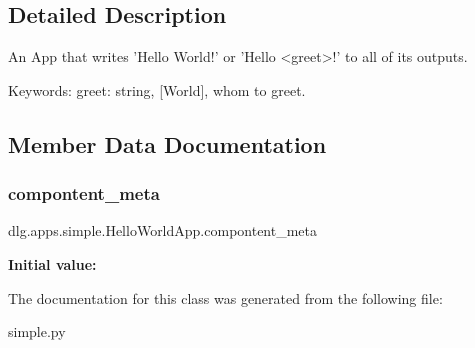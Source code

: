 \subsection{Detailed Description}
\begin{DoxyVerb}An App that writes 'Hello World!' or 'Hello <greet>!' to all of
its outputs.

Keywords:
greet:   string, [World], whom to greet.
\end{DoxyVerb}
 

\subsection{Member Data Documentation}
\mbox{\label{classdlg_1_1apps_1_1simple_1_1_hello_world_app_ae344c962f4f70c9c4f93d16e643cd506}} 
\subsubsection{\texorpdfstring{compontent\_meta}{compontent\_meta}}
{\footnotesize\ttfamily dlg.\+apps.\+simple.\+Hello\+World\+App.\+compontent\+\_\+meta\hspace{0.3cm}{\ttfamily [static]}}

{\bfseries Initial value\+:}
\begin{DoxyCode}{0}

\end{DoxyCode}


The documentation for this class was generated from the following file\+:\begin{DoxyCompactItemize}
\item 
simple.\+py\end{DoxyCompactItemize}

